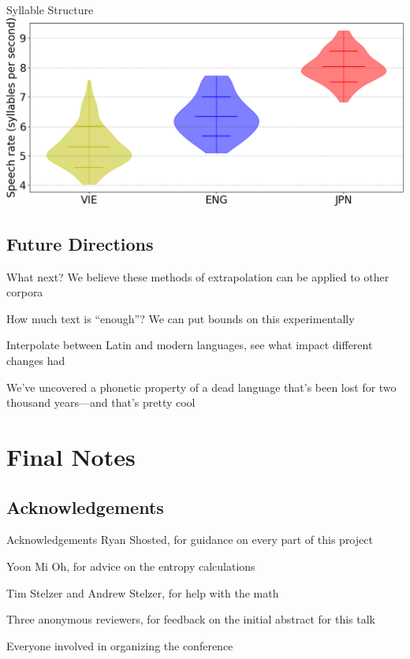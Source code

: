 \documentclass{beamer}
\begin{document}
\begin{frame}{Syllable Structure}
\includegraphics[width=\linewidth]{violin3}
\end{frame}

\subsection{Future Directions}

\begin{frame}{What next?}
We believe these methods of extrapolation can be applied to other corpora

How much text is ``enough''? We can put bounds on this experimentally

Interpolate between Latin and modern languages, see what impact different changes had

We've uncovered a phonetic property of a dead language that's been lost for two thousand years---and that's pretty cool
\end{frame}

\section{Final Notes}

\subsection{Acknowledgements}

\begin{frame}{Acknowledgements}
Ryan Shosted, for guidance on every part of this project

Yoon Mi Oh, for advice on the entropy calculations

Tim Stelzer and Andrew Stelzer, for help with the math

Three anonymous reviewers, for feedback on the initial abstract for this talk

Everyone involved in organizing the conference
\end{frame}
\end{document}
